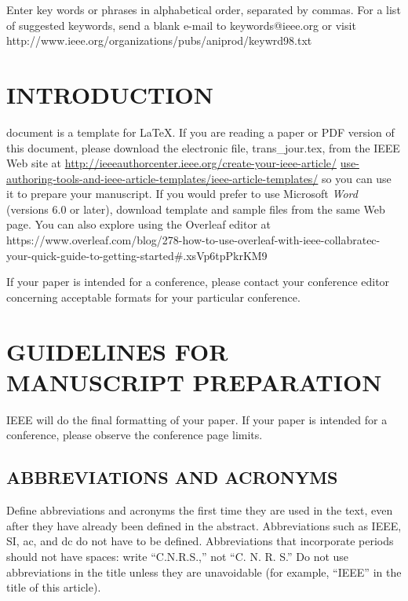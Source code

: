\documentclass{IEEEoj}
\begin{document}
\begin{IEEEkeywords}
Enter key words or phrases in alphabetical order, separated by commas. For a list of suggested keywords, send a blank e-mail to keywords@ieee.org or visit 
http://www.ieee.org/\discretionary{}{}{}organizations/pubs/ani\textunderscore prod/keywrd98.txt
\end{IEEEkeywords}


\maketitle

\section{INTRODUCTION}

 document is a template for \LaTeX. If you are
reading a paper or PDF version of this document, please download the
electronic file, trans\_jour.tex, from the IEEE Web site at \underline
{http://ieeeauthorcenter.ieee.org/create-your-ieee-article/}\break
\underline{use-authoring-tools-and-ieee-article-templates/ieee-article-}\break\underline{templates/}
so you can use it to prepare your manuscript.  If you would prefer to
use Microsoft \textit{Word} (versions 6.0 or later), download template
and sample files from the same Web page.  You can also explore using
the Overleaf editor at
{https://www.overleaf.com/blog/278-how-to-use-overleaf-with-ieee-collabratec-your-quick-guide-to-getting-started\break\#.xsVp6tpPkrKM9}

If your paper is intended for a conference, please contact your conference 
editor concerning acceptable formats for your particular 
conference.

\section{GUIDELINES FOR MANUSCRIPT PREPARATION}

IEEE will do the final formatting of your paper. If your paper is intended for a conference, please observe the conference page limits.

\subsection{ABBREVIATIONS AND ACRONYMS}
Define abbreviations and acronyms the first time they are used in the text, 
even after they have already been defined in the abstract. Abbreviations 
such as IEEE, SI, ac, and dc do not have to be defined. Abbreviations that 
incorporate periods should not have spaces: write ``C.N.R.S.,'' not ``C. N. 
R. S.'' Do not use abbreviations in the title unless they are unavoidable 
(for example, ``IEEE'' in the title of this article).
\end{document}
